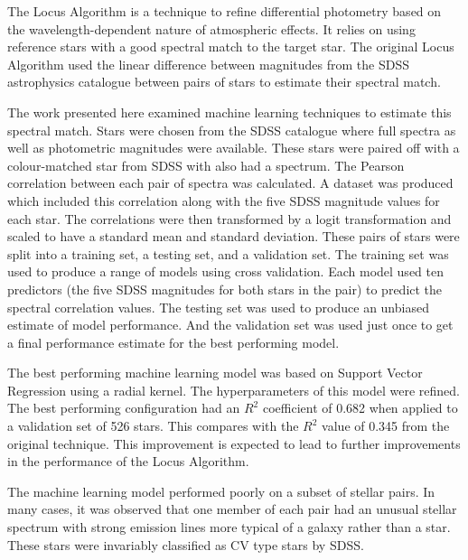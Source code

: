 \documentclass[preprint, 3p,
authoryear]{elsarticle} %
\begin{document}
The Locus Algorithm is a technique to refine differential photometry
based on the wavelength-dependent nature of atmospheric effects. It
relies on using reference stars with a good spectral match to the target
star. The original Locus Algorithm used the linear difference between
magnitudes from the SDSS astrophysics catalogue between pairs of stars
to estimate their spectral match.

The work presented here examined machine learning techniques to estimate
this spectral match. Stars were chosen from the SDSS catalogue where
full spectra as well as photometric magnitudes were available. These
stars were paired off with a colour-matched star from SDSS with also had
a spectrum. The Pearson correlation between each pair of spectra was
calculated. A dataset was produced which included this correlation along
with the five SDSS magnitude values for each star. The correlations were
then transformed by a logit transformation and scaled to have a standard
mean and standard deviation. These pairs of stars were split into a
training set, a testing set, and a validation set. The training set was
used to produce a range of models using cross validation. Each model
used ten predictors (the five SDSS magnitudes for both stars in the
pair) to predict the spectral correlation values. The testing set was
used to produce an unbiased estimate of model performance. And the
validation set was used just once to get a final performance estimate
for the best performing model.

The best performing machine learning model was based on Support Vector
Regression using a radial kernel. The hyperparameters of this model were
refined. The best performing configuration had an \(R^2\) coefficient of
0.682 when applied to a validation set of 526 stars. This compares with
the \(R^2\) value of 0.345 from the original technique. This improvement
is expected to lead to further improvements in the performance of the
Locus Algorithm.

The machine learning model performed poorly on a subset of stellar
pairs. In many cases, it was observed that one member of each pair had
an unusual stellar spectrum with strong emission lines more typical of a
galaxy rather than a star. These stars were invariably classified as CV
type stars by SDSS.

\renewcommand\refname{References}

\end{document}

